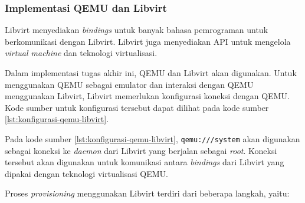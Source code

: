 \subsubsection{Implementasi QEMU dan Libvirt}
\label{sec:implementasi-libvirt}

Libvirt menyediakan \emph{bindings} untuk banyak bahasa pemrograman
untuk berkomunikasi dengan Libvirt. Libvirt juga menyediakan API untuk
mengelola \emph{virtual machine} dan teknologi virtualisasi.

Dalam implementasi tugas akhir ini, QEMU dan Libvirt akan digunakan.
Untuk menggunakan QEMU sebagai emulator dan interaksi dengan QEMU menggunakan Libvirt,
Libvirt memerlukan konfigurasi koneksi dengan QEMU. Kode sumber untuk konfigurasi
tersebut dapat dilihat pada kode sumber \ref{lst:konfigurasi-qemu-libvirt}.



Pada kode sumber \ref{lst:konfigurasi-qemu-libvirt}, \lstinline{qemu:///system} akan
digunakan sebagai koneksi ke \emph{daemon} dari Libvirt yang berjalan sebagai \emph{root}.
Koneksi tersebut akan digunakan untuk komunikasi antara \emph{bindings} dari Libvirt yang
dipakai dengan teknologi virtualisasi QEMU.

Proses \emph{provisioning} menggunakan Libvirt terdiri dari beberapa langkah, yaitu:

